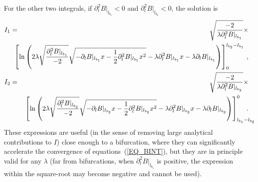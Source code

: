 For the other two integrals, if $\partial^2_l B|_{l_{b_1}}<0$ and $\partial^2_l B|_{l_{b_2}}<0$, the solution is
\begin{eqnarray} 
I_1 &=&  \sqrt{\frac{-2}{\lambda\partial^2_l B|_{l_{b_1}}}}  \times\nonumber\\
& &\hskip-0.5cm \left[\mathrm{ln}\left(2\lambda\sqrt{\frac{\partial^2_l B|_{l_{b_1}}}{-2}}\sqrt{ -\partial_l B|_{l_{b_1}}x -\frac{1}{2}\partial^2_l B|_{l_{b_1}}x^2} -\lambda \partial^2_l B|_{l_{b_1}} x -\lambda\partial_l B|_{l_{b_1}}\right)\right]_0^{l_{b_2}-l_{b_1}}\,,\nonumber\\
I_2 &=&  \sqrt{\frac{-2}{\lambda\partial^2_l B|_{l_{b_2}}}}  \times\nonumber\\
& &\hskip-0.5cm\left[\mathrm{ln}\left(2\lambda\sqrt{\frac{\partial^2_l B|_{l_{b_2}}}{-2}}\sqrt{ -\partial_l B|_{l_{b_2}}x -\frac{1}{2}\partial^2_l B|_{l_{b_2}}x^2} -\lambda \partial^2_l B|_{l_{b_2}} x -\lambda\partial_l B|_{l_{b_2}}\right)\right]_{l_{b_1}-l_{b_2}}^0\hskip-0.5cm.
\end{eqnarray} 
These expressions are useful (in the sense of removing large analytical contributions to $I$) close enough to a bifurcation, where they can significantly accelerate the convergence of equations~(\ref{EQ_BINT}), but they are in principle valid for any $\lambda$ (far from bifurcations,  when $\partial^2_l B|_{l_{b_1}}$ is positive, the expression within the square-root may become negative and cannot be used).



